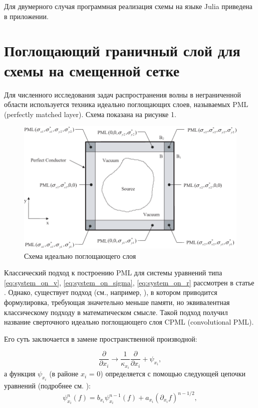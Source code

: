 \documentclass[a4paper, fontsize=14pt]{article}
\begin{document}
Для двумерного случая программная реализация схемы на языке Julia приведена в приложении.

\section*{Поглощающий граничный слой для схемы на смещенной сетке} 

Для численного исследования задач распространения волны в неграниченной области используется техника идеально поглощающих слоев, называемых PML (perfectly matched layer). Схема показана на рисунке 1.

\begin{figure}[h!]
    \begin{center}
        \includegraphics[width=15cm]{./assets/pml.png}    
    \end{center}
    \caption{Схема идеально поглощающего слоя}
\end{figure}

Классический подход к построению PML для системы уравнений типа  \eqref{eq:system_on_v}, \eqref{eq:system_on_sigma}, \eqref{eq:system_on_r} рассмотрен в статье \cite{Collino}.
Однако, существует подход (см., например, \cite{Martin}), в котором приводится формулировка, требующая значетельно меньше памяти, но эквивалентная классическому подходу в математическом смысле.
Такой подход получил название сверточного идеально поглощающего слоя CPML (convolutional PML).

Его суть заключается в замене пространственной производной:

\begin{equation}
    \frac{\partial}{\partial x_i} \rightarrow \frac{1}{\kappa_{x_i}}\frac{\partial}{\partial x_i} + \psi_{x_i},
\end{equation}
а функция $\psi_{x_i}$ (в районе $x_i$ = 0) определяется с помощью следующей цепочки уравнений (подробнее см. \cite{Martin}):
\begin{equation}
    \psi_{x_i}^{n}(f)=b_{x_i}\psi_{x_i}^{n-1}(f)+a_{x_i}\left(\partial_{x_i}f\right)^{n-1/2},
\end{equation}
\end{document}
